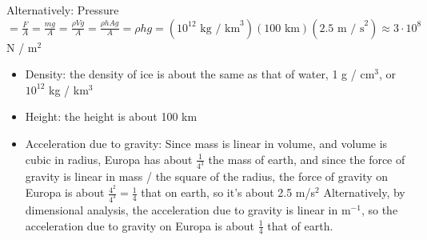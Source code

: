 \documentclass{esg8012pset}
\begin{document}
\begin{question}[Problem 2]
\begin{solution}
  Alternatively:
  Pressure $ = \frac{F}{A} = \frac{mg}{A} = \frac{\rho Vg}{A} = \frac{\rho h A g}{A} = \rho h g = (10^{12}\text{ kg / km}^3)(100\text{ km})(2.5\text{ m / s}^2) \approx 3\cdot 10^8$ N / m$^2$
  \begin{itemize}
    \item Density: the density of ice is about the same as that of water, 1 g / cm$^3$, or $10^{12}$ kg / km$^3$
    \item Height: the height is about 100 km
    \item Acceleration due to gravity: Since mass is linear in volume, and volume is cubic in radius, Europa has about $\frac{1}{4^3}$ the mass of earth, and since the force of gravity is linear in mass / the square of the radius, the force of gravity on Europa is about $\frac{4^2}{4^3} = \frac{1}{4}$ that on earth, so it's about 2.5 m/s$^2$  Alternatively, by dimensional analysis, the acceleration due to gravity is linear in m$^{-1}$, so the acceleration due to gravity on Europa is about $\frac{1}{4}$ that of earth.
  \end{itemize}
\end{solution}%


\end{question}
\end{document}
